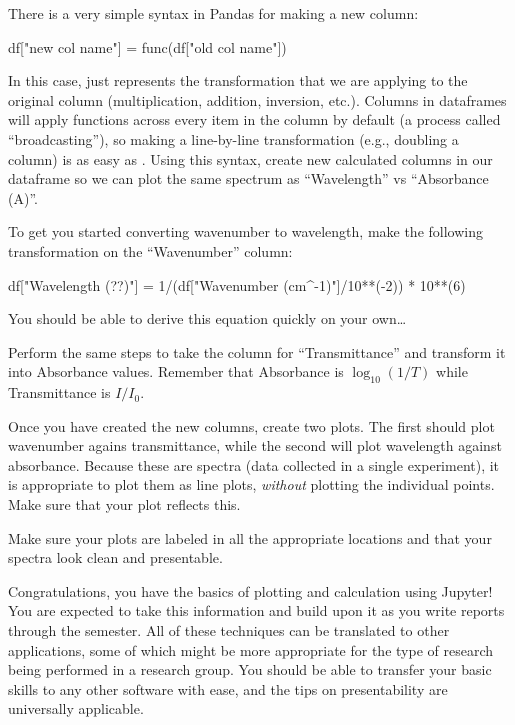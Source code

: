 \documentclass[nobib,nofonts,nols,nohyper]{tufte-handout}
\begin{document}
There is a very simple syntax in Pandas for making a new column:
\begin{pyinput}
df["new col name"] = func(df["old col name"])
\end{pyinput}
In this case,  just represents the transformation that we are applying to the original column (multiplication, addition, inversion, etc.).
Columns in dataframes will apply functions across every item in the column by default (a process called ``broadcasting''), so making a line-by-line transformation (e.g., doubling a column) is as easy as .
Using this syntax, create new calculated columns in our dataframe so we can plot the same spectrum as ``Wavelength'' vs ``Absorbance (A)''.

To get you started converting wavenumber to wavelength, make the following transformation on the ``Wavenumber'' column:
\begin{pyinput}
df["Wavelength (??)"] = 1/(df["Wavenumber (cm^-1)"]/10**(-2)) * 10**(6)
\end{pyinput}
You should be able to derive this equation quickly on your own…

Perform the same steps to take the column for ``Transmittance'' and transform it into Absorbance values.
Remember that Absorbance is \(\log_{10}(1/T)\) while Transmittance is \(I / I_0\).

Once you have created the new columns, create two plots.
The first should plot wavenumber agains transmittance, while the second will plot wavelength against absorbance.
Because these are spectra (data collected in a single experiment), it is appropriate to plot them as line plots, \emph{without} plotting the individual points.
Make sure that your plot reflects this.

Make sure your plots are labeled in all the appropriate locations and that your spectra look clean and presentable.

Congratulations, you have the basics of plotting and calculation using Jupyter!
You are expected to take this information and build upon it as you write reports through the semester.
All of these techniques can be translated to other applications, some of which might be more appropriate for the type of research being performed in a research group.
You should be able to transfer your basic skills to any other software with ease, and the tips on presentability are universally applicable.
\end{document}
